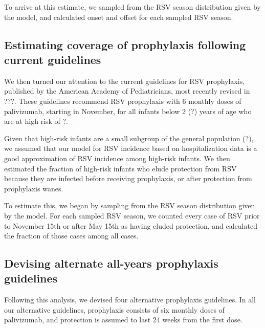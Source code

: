 \documentclass{article}\usepackage[]{graphicx}\usepackage[]{color}
\begin{document}
\begin{multicols}{2}
To arrive at this estimate, we sampled from the RSV season distribution given by the model, and calculated onset and offset for each sampled RSV season.

\subsection{Estimating coverage of prophylaxis following current guidelines}

We then turned our attention to the current guidelines for RSV prophylaxis, published by the American Academy of Pediatricians, most recently revised in ???. These guidelines recommend RSV prophylaxis with 6 monthly doses of palivizumab, starting in November, for all infants below 2 (?) years of age who are at high risk of ?. 

Given that high-risk infants are a small subgroup of the general population (?), we assumed that our model for RSV incidence based on hospitalization data is a good approximation of RSV incidence among high-risk infants. We then estimated the fraction of high-risk infants who elude protection from RSV because they are infected before receiving prophylaxis, or after protection from prophylaxis wanes.

To estimate this, we began by sampling from the RSV season distribution given by the model. For each sampled RSV season, we counted every case of RSV prior to November 15th or after May 15th as having eluded protection, and calculated the fraction of those cases among all cases. 

\subsection{Devising alternate all-years prophylaxis guidelines}

Following this analysis, we devised four alternative prophylaxis guidelines. In all our alternative guidelines, prophylaxis consists of six monthly doses of palivizumab, and protection is assumed to last 24 weeks from the first dose.


\end{multicols}
\end{document}
